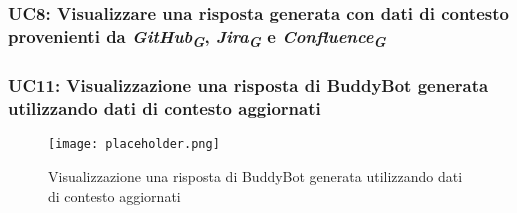 \hypertarget{UC8}{}
\subsubsection{UC8: Visualizzare una risposta generata con dati di contesto provenienti da 
\emph{GitHub}\textsubscript{\textbf{\textit{G}}}, \emph{Jira}\textsubscript{\textbf{\textit{G}}} e 
\emph{Confluence}\textsubscript{\textbf{\textit{G}}}}






\hypertarget{UC11}{}
\subsubsection{UC11: Visualizzazione una risposta di BuddyBot generata utilizzando dati di contesto aggiornati}

\begin{figure}[h]
    \centering
    \texttt{[image: placeholder.png]}
    \caption{Visualizzazione una risposta di BuddyBot generata utilizzando dati di contesto aggiornati}
\end{figure}

